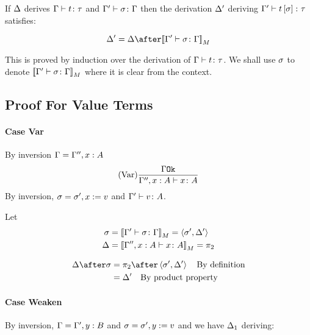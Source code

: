 \documentclass{report}
\begin{document}
If $\Delta$ derives $\Gamma \vdash t \colon \tau$ and $\Gamma' \vdash \sigma \colon \Gamma$ then the derivation $\Delta'$ deriving $\Gamma' \vdash t\left[\sigma\right] \colon \tau$ satisfies:

\begin{equation}
    \D' = \D \after\deno{\typerelation{\G'}{\si}{\G}}
\end{equation}

This is proved by induction over the derivation of $\Gamma \vdash t \colon \tau$.
We shall use $\sigma$ to denote ${\bf [\![}\Gamma' \vdash \sigma \colon \Gamma{\bf ]\!]}_M$ where it is clear from the context.
\subsection{Proof For Value Terms}
\paragraph{Case Var}
By inversion $\Gamma = \Gamma'', x:A$
\begin{equation}
    (\text{Var}) \frac{\Gamma \texttt{Ok}}{\Gamma'', x:A \vdash x \colon A}
\end{equation}
By inversion, $\sigma = \sigma', x:= v$ and $\Gamma' \vdash v \colon A$.

Let 
\begin{align}
    \sigma &={\bf [\![}\Gamma' \vdash \sigma \colon \Gamma{\bf ]\!]}_M = \left\langle\sigma', \Delta'\right\rangle\\
    \Delta &={\bf [\![}\Gamma'', x:A \vdash x \colon A{\bf ]\!]}_M = \pi_2\\
\end{align}

\begin{align}
    \D\after\si &= \pp\after\pr{\si'}{\D'}\qt{By definition}\\
    &= \D'\qt{By product property}
\end{align}
\paragraph{Case Weaken}
By inversion, $\Gamma = \Gamma', y:B$ and $\sigma = \sigma', y:= v$
and we have $\Delta_1$ deriving:
\end{document}
